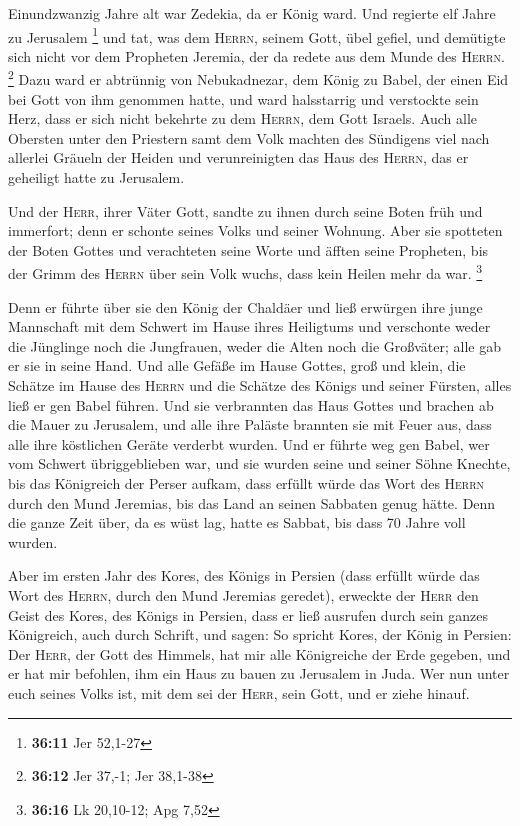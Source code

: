  Einundzwanzig Jahre alt war Zedekia, da er König ward.
Und regierte elf Jahre zu Jerusalem \footnote{\textbf{36:11} Jer 52,1-27}
 und tat, was dem \textsc{Herrn}, seinem Gott, übel
gefiel, und demütigte sich nicht vor dem Propheten Jeremia, der da
redete aus dem Munde des \textsc{Herrn}. \footnote{\textbf{36:12} Jer
  37,-1; Jer 38,1-38}  Dazu ward er abtrünnig von
Nebukadnezar, dem König zu Babel, der einen Eid bei Gott von ihm
genommen hatte, und ward halsstarrig und verstockte sein Herz, dass er
sich nicht bekehrte zu dem \textsc{Herrn}, dem Gott Israels.
 Auch alle Obersten unter den Priestern samt dem Volk
machten des Sündigens viel nach allerlei Gräueln der Heiden und
verunreinigten das Haus des \textsc{Herrn}, das er geheiligt hatte zu
Jerusalem.

 Und der \textsc{Herr}, ihrer Väter Gott, sandte zu ihnen
durch seine Boten früh und immerfort; denn er schonte seines Volks und
seiner Wohnung.  Aber sie spotteten der Boten Gottes und
verachteten seine Worte und äfften seine Propheten, bis der Grimm des
\textsc{Herrn} über sein Volk wuchs, dass kein Heilen mehr da war.
\footnote{\textbf{36:16} Lk 20,10-12; Apg 7,52}

 Denn er führte über sie den König der Chaldäer und ließ
erwürgen ihre junge Mannschaft mit dem Schwert im Hause ihres Heiligtums
und verschonte weder die Jünglinge noch die Jungfrauen, weder die Alten
noch die Großväter; alle gab er sie in seine Hand.  Und
alle Gefäße im Hause Gottes, groß und klein, die Schätze im Hause des
\textsc{Herrn} und die Schätze des Königs und seiner Fürsten, alles ließ
er gen Babel führen.  Und sie verbrannten das Haus Gottes
und brachen ab die Mauer zu Jerusalem, und alle ihre Paläste brannten
sie mit Feuer aus, dass alle ihre köstlichen Geräte verderbt wurden.
 Und er führte weg gen Babel, wer vom Schwert
übriggeblieben war, und sie wurden seine und seiner Söhne Knechte, bis
das Königreich der Perser aufkam,  dass erfüllt würde das
Wort des \textsc{Herrn} durch den Mund Jeremias, bis das Land an seinen
Sabbaten genug hätte. Denn die ganze Zeit über, da es wüst lag, hatte es
Sabbat, bis dass 70 Jahre voll wurden.

 Aber im ersten Jahr des Kores, des Königs in Persien
(dass erfüllt würde das Wort des \textsc{Herrn}, durch den Mund Jeremias
geredet), erweckte der \textsc{Herr} den Geist des Kores, des Königs in
Persien, dass er ließ ausrufen durch sein ganzes Königreich, auch durch
Schrift, und sagen:  So spricht Kores, der König in
Persien: Der \textsc{Herr}, der Gott des Himmels, hat mir alle
Königreiche der Erde gegeben, und er hat mir befohlen, ihm ein Haus zu
bauen zu Jerusalem in Juda. Wer nun unter euch seines Volks ist, mit dem
sei der \textsc{Herr}, sein Gott, und er ziehe hinauf.

